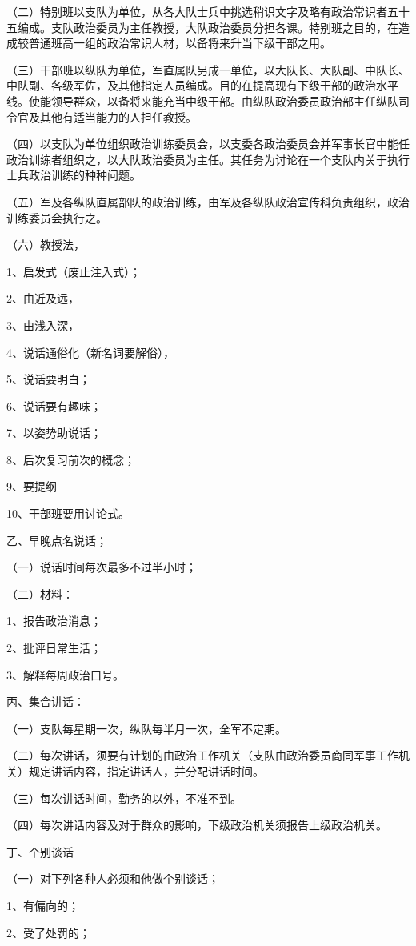 （二）特别班以支队为单位，从各大队士兵中挑选稍识文字及略有政治常识者五十五编成。支队政治委员为主任教授，大队政治委员分担各课。特别班之目的，在造成较普通班高一组的政治常识人材，以备将来升当下级干部之用。

（三）干部班以纵队为单位，军直属队另成一单位，以大队长、大队副、中队长、中队副、各级军佐，及其他指定人员编成。目的在提高现有下级干部的政治水平线。使能领导群众，以备将来能充当中级干部。由纵队政治委员政治部主任纵队司令官及其他有适当能力的人担任教授。

（四）以支队为单位组织政治训练委员会，以支委各政治委员会并军事长官中能任政治训练者组织之，以大队政治委员为主任。其任务为讨论在一个支队内关于执行士兵政治训练的种种问题。

（五）军及各纵队直属部队的政治训练，由军及各纵队政治宣传科负责组织，政治训练委员会执行之。

（六）教授法，

1、启发式（废止注入式）；

2、由近及远，

3、由浅入深，

4、说话通俗化（新名词要解俗），

5、说话要明白；

6、说话要有趣味；

7、以姿势助说话；

8、后次复习前次的概念；

9、要提纲

10、干部班要用讨论式。

乙、早晚点名说话；

（一）说话时间每次最多不过半小时；

（二）材料：

1、报告政治消息；

2、批评日常生活；

3、解释每周政治口号。

丙、集合讲话：

（一）支队每星期一次，纵队每半月一次，全军不定期。

（二）每次讲话，须要有计划的由政治工作机关（支队由政治委员商同军事工作机关）规定讲话内容，指定讲话人，并分配讲话时间。

（三）每次讲话时间，勤务的以外，不准不到。

（四）每次讲话内容及对于群众的影响，下级政治机关须报告上级政治机关。

丁、个别谈话

（一）对下列各种人必须和他做个别谈话；

1、有偏向的；

2、受了处罚的；

